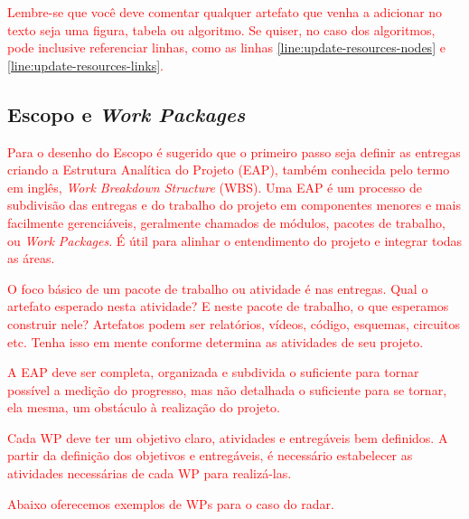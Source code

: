\textcolor{red}{Lembre-se que você deve comentar qualquer artefato que venha a adicionar no texto seja uma figura, tabela ou algoritmo. Se quiser, no caso dos algoritmos, pode inclusive referenciar linhas, como as linhas \ref{line:update-resources-nodes} e \ref{line:update-resources-links}.}

\subsection{Escopo e \textit{Work Packages}}

\textcolor{red}{Para o desenho do Escopo é sugerido que o primeiro passo seja definir as entregas criando a Estrutura Analítica do Projeto (EAP), também conhecida pelo termo em inglês, \textit{Work Breakdown Structure} (WBS). Uma EAP é um processo de subdivisão das entregas e do trabalho do projeto em componentes menores e mais facilmente gerenciáveis, geralmente chamados de módulos, pacotes de trabalho, ou \textit{Work Packages}. É útil para alinhar o entendimento do projeto e integrar todas as áreas.}

\textcolor{red}{O foco básico de um pacote de trabalho ou atividade é nas entregas. Qual o artefato esperado nesta atividade? E neste pacote de trabalho, o que esperamos construir nele? Artefatos podem ser relatórios, vídeos, código, esquemas, circuitos etc. Tenha isso em mente conforme determina as atividades de seu projeto.}

\textcolor{red}{A EAP deve ser completa, organizada e subdivida o suficiente para tornar possível a medição do progresso, mas não detalhada o suficiente para se tornar, ela mesma, um obstáculo à realização do projeto.}

\textcolor{red}{Cada WP deve ter um objetivo claro, atividades e entregáveis bem definidos. A partir da definição dos objetivos e entregáveis, é necessário estabelecer as atividades necessárias de cada WP para realizá-las.}

\textcolor{red}{Abaixo oferecemos exemplos de WPs para o caso do radar.}

